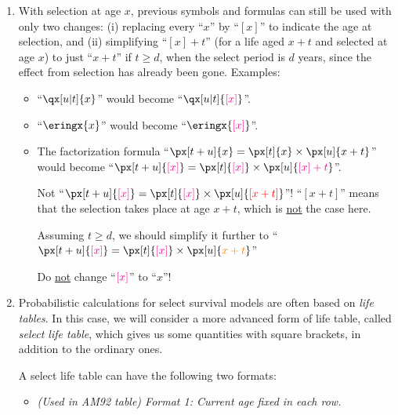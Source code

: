 \begin{enumerate}
\item With selection at age \(x\), previous symbols and formulas can still be
used with only two changes: (i) replacing every ``\(x\)'' by ``\([x]\)'' to
indicate the age at selection, and (ii) simplifying ``\([x]+t\)'' (for a life
aged \(x+t\) and selected at age \(x\)) to just ``\(x+t\)'' if \(t\ge d\), when
the select period is \(d\) years, since the effect from selection has already
been gone. Examples:
\begin{itemize}
\item ``\(\qx[u|t]{x}\)'' would become ``\(\qx[u|t]{\mgc{[x]}}\)''.
\item ``\(\eringx{x}\)'' would become ``\(\eringx{\mgc{[x]}}\)''.
\item The factorization formula ``\(\px[t+u]{x}=\px[t]{x}\times \px[u]{x+t}\)'' would become
``\(\px[t+u]{\mgc{[x]}}=\px[t]{\mgc{[x]}}\times \px[u]{\mgc{[x]+t}}\)''.
\begin{warning}
Not ``\(\px[t+u]{\mgc{[x]}}=\px[t]{\mgc{[x]}}\times \px[u]{\rc{[x+t]}}\)''!
``\([x+t]\)'' means that the selection takes place at age \(x+t\), which is
\underline{not} the case here.
\end{warning}

Assuming \(t\ge d\), we should simplify it further to
``\(\px[t+u]{\mgc{[x]}}=\px[t]{\mgc{[x]}}\times \px[u]{\orc{x+t}}\)''

\begin{warning}
Do \underline{not} change ``\({\color{magenta}[x]}\)'' to ``\(x\)''!
\end{warning}
\end{itemize}

\item Probabilistic calculations for select survival models are often based on
\emph{life tables}. In this case, we will consider a more advanced form of life
table, called \emph{select life table}, which gives us some quantities with
square brackets, in addition to the ordinary ones.

A select life table can have the following two formats:
\begin{itemize}
\item \emph{(Used in AM92 table) Format 1: Current age fixed in each row.}


\end{itemize}
\end{enumerate}
